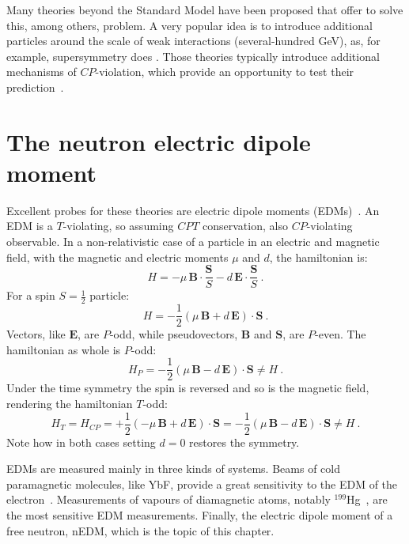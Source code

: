 Many theories beyond the Standard Model have been proposed that offer to solve this, among others, problem. A very popular idea is to introduce additional particles around the scale of weak interactions (several-hundred GeV), as, for example, supersymmetry does . Those theories typically introduce additional mechanisms of $CP$-violation, which provide an opportunity to test their prediction~\cite{Ellis1989}.



\section{The neutron electric dipole moment}

Excellent probes for these theories are electric dipole moments (EDMs)~\cite{Pospelov2005}. An EDM is a $T$-violating, so assuming $CPT$ conservation, also $CP$-violating observable. In a non-relativistic case of a particle in an electric and magnetic field, with the magnetic and electric moments $\mu$ and $d$, the hamiltonian is:
\begin{equation}
  H = - \mu \, \bm{B} \cdot \frac{\bm{S}}{S} - d \, \bm{E} \cdot \frac{\bm{S}}{S} \ .
\end{equation}
For a spin $S = \frac{1}{2}$ particle:
\begin{equation}
  H = - \frac{1}{2} \left( \mu \, \bm{B} + d \, \bm{E} \right ) \cdot \bm{S} \ .
\end{equation}
Vectors, like $\bm{E}$, are $P$-odd, while pseudovectors, $\bm{B}$ and $\bm{S}$, are $P$-even. The hamiltonian as whole is $P$-odd:
\begin{equation}
  H_P = - \frac{1}{2} \left( \mu \, \bm{B} - d \, \bm{E} \right ) \cdot \bm{S} \neq H \ .
\end{equation}
Under the time symmetry the spin is reversed and so is the magnetic field, rendering the hamiltonian $T$-odd:
\begin{equation}
  H_T = H_{CP} = + \frac{1}{2} \left( - \mu \, \bm{B} + d \, \bm{E} \right ) \cdot \bm{S} = - \frac{1}{2} \left( \mu \, \bm{B} - d \, \bm{E} \right ) \cdot \bm{S} \neq H \ .
\end{equation}
Note how in both cases setting $d = 0$ restores the symmetry.

EDMs are measured mainly in three kinds of systems. Beams of cold paramagnetic molecules, like YbF, provide a great sensitivity to the EDM of the electron~\cite{Hudson2011}. Measurements of vapours of diamagnetic atoms, notably $^{199}$Hg~\cite{PhysRevLett.116.161601}, are the most sensitive EDM measurements. Finally, the electric dipole moment of a free neutron, nEDM, which is the topic of this chapter.

